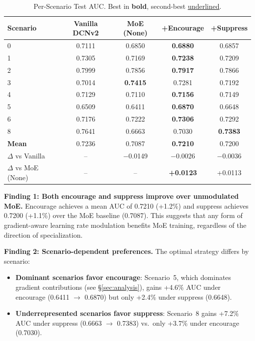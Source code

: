 \documentclass{article}
\begin{document}
\begin{table}[H]
\centering
\caption{Per-Scenario Test AUC. Best in \textbf{bold}, second-best \underline{underlined}.}
\label{tab:main}
\begin{tabular}{lcccc}
\toprule
\textbf{Scenario} & \textbf{Vanilla DCNv2} & \textbf{MoE (None)} & \textbf{+Encourage} & \textbf{+Suppress} \\
\midrule
0 & 0.7111 & 0.6850 & \textbf{0.6880} & 0.6857 \\
1 & 0.7305 & 0.7169 & \textbf{0.7238} & 0.7209 \\
2 & 0.7999 & 0.7856 & \textbf{0.7917} & 0.7866 \\
3 & 0.7014 & \textbf{0.7415} & 0.7281 & 0.7192 \\
4 & 0.7129 & 0.7110 & \textbf{0.7156} & 0.7149 \\
5 & 0.6509 & 0.6411 & \textbf{0.6870} & 0.6648 \\
6 & 0.7176 & 0.7222 & \textbf{0.7306} & 0.7292 \\
8 & 0.7641 & 0.6663 & 0.7030 & \textbf{0.7383} \\
\midrule
\textbf{Mean} & 0.7236 & 0.7087 & \textbf{0.7210} & 0.7200 \\
$\Delta$ vs Vanilla & -- & $-$0.0149 & $-$0.0026 & $-$0.0036 \\
$\Delta$ vs MoE (None) & -- & -- & \textbf{+0.0123} & +0.0113 \\
\bottomrule
\end{tabular}
\end{table}

\textbf{Finding 1: Both encourage and suppress improve over unmodulated MoE.}
Encourage achieves a mean AUC of 0.7210 (+1.2\%) and suppress achieves 0.7200 (+1.1\%) over the MoE baseline (0.7087).
This suggests that any form of gradient-aware learning rate modulation benefits MoE training, regardless of the direction of specialization.

\textbf{Finding 2: Scenario-dependent preferences.}
The optimal strategy differs by scenario:
\begin{itemize}
    \item \textbf{Dominant scenarios favor encourage}: Scenario~5, which dominates gradient contributions (see \S\ref{sec:analysis}), gains +4.6\% AUC under encourage (0.6411 $\rightarrow$ 0.6870) but only +2.4\% under suppress (0.6648).
    \item \textbf{Underrepresented scenarios favor suppress}: Scenario~8 gains +7.2\% AUC under suppress (0.6663 $\rightarrow$ 0.7383) vs.\ only +3.7\% under encourage (0.7030).
\end{itemize}
\end{document}
